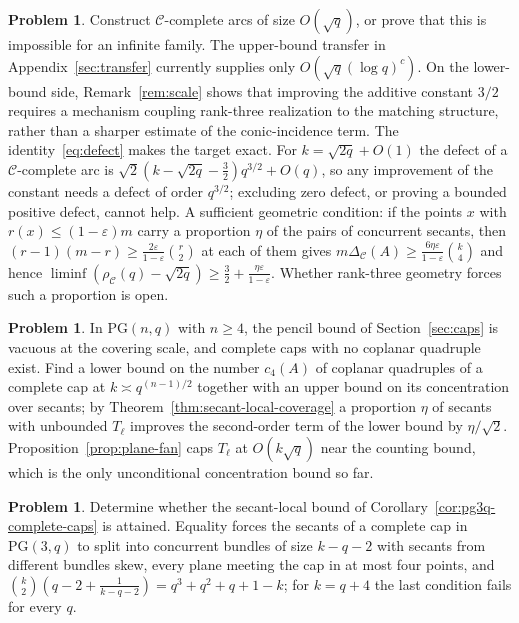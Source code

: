 \documentclass[11pt]{article}
\theoremstyle{definition}
\newtheorem{problem}[theorem]{Problem}
\theoremstyle{remark}
\newcommand{\PG}{\mathrm{PG}}
\newcommand{\cC}{\mathcal{C}}
\newcommand{\rhoC}{\rho_{\cC}}
\begin{document}
\begin{problem}
Construct $\cC$-complete arcs of size $O(\sqrt q)$, or prove that this is
impossible for an infinite family.  The upper-bound transfer in
Appendix~\ref{sec:transfer} currently supplies only
$O(\sqrt q(\log q)^c)$.  On the lower-bound side,
Remark~\ref{rem:scale} shows that improving the additive constant \(3/2\)
requires a mechanism coupling rank-three realization to the matching
structure, rather than a sharper estimate of the conic-incidence term.
The identity~\eqref{eq:defect} makes the target exact.  For
$k=\sqrt{2q}+O(1)$ the defect of a $\cC$-complete arc is
$\sqrt2(k-\sqrt{2q}-\tfrac32)q^{3/2}+O(q)$, so any improvement of the
constant needs a defect of order $q^{3/2}$; excluding zero defect, or
proving a bounded positive defect, cannot help.  A sufficient geometric
condition: if the points $x$ with $r(x)\le(1-\varepsilon)m$ carry a
proportion $\eta$ of the pairs of concurrent secants, then
$(r-1)(m-r)\ge\frac{2\varepsilon}{1-\varepsilon}\binom r2$ at each of them
gives $m\Delta_{\cC}(A)\ge\frac{6\eta\varepsilon}{1-\varepsilon}\binom{k}{4}$
and hence
$\liminf(\rhoC(q)-\sqrt{2q})\ge\frac32+\frac{\eta\varepsilon}{1-\varepsilon}$.
Whether rank-three geometry forces such a proportion is open.
\end{problem}

\begin{problem}
In $\PG(n,q)$ with $n\ge4$, the pencil bound of
Section~\ref{sec:caps} is vacuous at the covering scale, and complete caps
with no coplanar quadruple exist.  Find a lower bound on the number
$c_4(A)$ of coplanar quadruples of a complete cap at
$k\asymp q^{(n-1)/2}$ together with an upper bound on its concentration over
secants; by Theorem~\ref{thm:secant-local-coverage} a proportion $\eta$ of
secants with unbounded $T_\ell$ improves the second-order term of the
lower bound by $\eta/\sqrt2$.  Proposition~\ref{prop:plane-fan} caps
$T_\ell$ at $O(k\sqrt q)$ near the counting bound, which is the only
unconditional concentration bound so far.
\end{problem}

\begin{problem}
Determine whether the secant-local bound of
Corollary~\ref{cor:pg3q-complete-caps} is attained.  Equality forces the
secants of a complete cap in $\PG(3,q)$ to split into concurrent bundles of
size $k-q-2$ with secants from different bundles skew, every plane meeting
the cap in at most four points, and $\binom{k}{2}(q-2+\frac1{k-q-2})=q^3+q^2+q+1-k$;
for $k=q+4$ the last condition fails for every $q$.
\end{problem}
\end{document}
